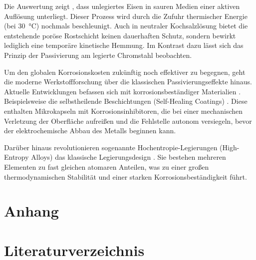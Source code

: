\documentclass[11pt,a4paper]{article}
\numberwithin{equation}{section}
\begin{document}
Die Auswertung zeigt , dass unlegiertes Eisen in sauren Medien einer aktiven Auflösung unterliegt. Dieser Prozess wird durch die Zufuhr thermischer Energie (bei \qty{30}{\celsius}) nochmals beschleunigt. Auch in neutraler Kochsalzlösung bietet die entstehende poröse Rostschicht keinen dauerhaften Schutz, sondern bewirkt lediglich eine temporäre kinetische Hemmung. Im  Kontrast dazu l\"asst sich das Prinzip der Passivierung am legierte Chromstahl beobachten.

\noindent Um den globalen Korrosionskosten zukünftig noch effektiver zu begegnen, geht die moderne Werkstoffforschung über die klassischen Passivierungseffekte hinaus. Aktuelle Entwicklungen befassen sich mit korrosionsbest\"andiger Materialien . Beispielsweise die selbstheilende Beschichtungen (Self-Healing Coatings) \cite{zhang2018self}. Diese enthalten Mikrokapseln mit Korrosionsinhibitoren, die bei einer mechanischen Verletzung der Oberfläche aufreißen und die Fehlstelle autonom versiegeln, bevor der elektrochemische Abbau des Metalls beginnen kann. 

\noindent Darüber hinaus revolutionieren sogenannte Hochentropie-Legierungen (High-Entropy Alloys) das klassische Legierungsdesign \cite{liang2024corrosion}. Sie bestehen mehreren Elementen zu fast gleichen atomaren Anteilen, was zu einer gro{\ss}en thermodynamischen Stabilität und einer starken Korrosionsbeständigkeit f\"uhrt. 

\newpage
\appendix
\section{Anhang}

\newpage
\section{Literaturverzeichnis}



\end{document}
